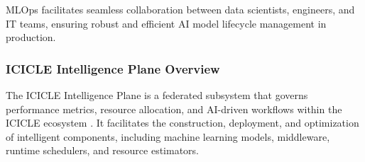 MLOps facilitates seamless collaboration between data scientists, engineers, and IT teams, ensuring robust and efficient AI model lifecycle management in production.

\subsubsection{ICICLE Intelligence Plane Overview}

The ICICLE Intelligence Plane is a federated subsystem that governs performance metrics, resource allocation, and AI-driven workflows within the ICICLE ecosystem \cite{panda2024creating}. It facilitates the construction, deployment, and optimization of intelligent components, including machine learning models, middleware, runtime schedulers, and resource estimators.

